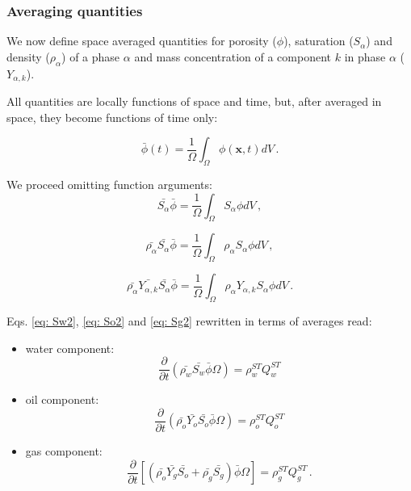 \documentclass[authoryear,preprint,review,12pt]{elsarticle}
\begin{document}
\subsubsection{Averaging quantities}

We now define space averaged quantities for porosity ($\phi$), saturation ($S_\alpha$) and density ($\rho_\alpha$) of a phase $\alpha$ and mass concentration of a component $k$ in phase $\alpha$ ($Y_{\alpha,k}$).

All quantities are locally functions of space and time, but, after averaged in space, they become functions of time only:

\begin{equation}
\bar{\phi} (t) = \frac{1}{\Omega}\int_{\Omega}\phi \left(\mathbf{x},t\right) dV \, .
\end{equation}

We proceed omitting function arguments:
\begin{equation}
\bar{S_\alpha}\bar{\phi} = \frac{1}{\Omega}\int_{\Omega}S_\alpha \phi dV \, ,
\end{equation}

\begin{equation}
\bar{\rho_\alpha}\bar{S_\alpha}\bar{\phi} = \frac{1}{\Omega}\int_{\Omega}\rho_\alpha S_\alpha \phi dV \, ,
\end{equation}

\begin{equation}
\bar{\rho_\alpha}\bar{Y_{\alpha,k}}\bar{S_\alpha}\bar{\phi} = \frac{1}{\Omega}\int_{\Omega}\rho_\alpha Y_{\alpha,k} S_\alpha \phi dV \, .
\end{equation}

Eqs. \eqref{eq: Sw2}, \eqref{eq: So2} and \eqref{eq: Sg2} rewritten in terms of averages read:

\begin{itemize}
\item water component:
\begin{equation}\label{eq: Sw3}
\frac{\partial}{\partial t} \left( \bar{\rho_w}\bar{S_w}\bar{\phi} \Omega \right) = \rho_w^{ST}Q_w^{ST}
\end{equation}

\item oil component:
\begin{equation}\label{eq: So3}
\frac{\partial}{\partial t} \left( \bar{\rho_o}\bar{Y_o}\bar{S_o}\bar{\phi} \Omega \right) = \rho_o^{ST}Q_o^{ST}
\end{equation}

\item gas component:
\begin{equation}\label{eq: Sg3}
\frac{\partial}{\partial t} \left[\left( \bar{\rho_o}\bar{Y_g} \bar{S_o} + \bar{\rho_g} \bar{S_g} \right) \bar{\phi} \Omega\right] = \rho_g^{ST}Q_g^{ST} \, .
\end{equation}
\end{itemize}
\end{document}
